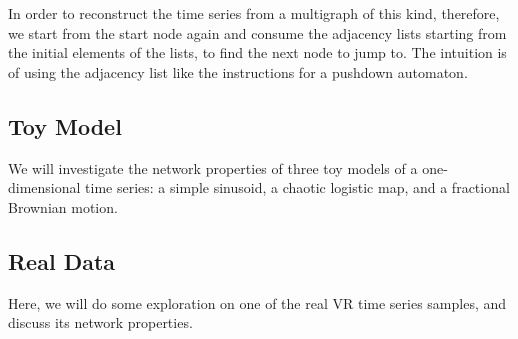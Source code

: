 \documentclass[12pt]{article}
\begin{document}
In order to reconstruct the time series from a multigraph of this kind, therefore, we start from the start node again and consume the adjacency lists starting from the initial elements of the lists, to find the next node to jump to. The intuition is of using the adjacency list like the instructions for a pushdown automaton\cite{pushdown}.


\subsection{Toy Model}

We will investigate the network properties of three toy models of a one-dimensional time series: a simple sinusoid, a chaotic logistic map, and a fractional Brownian motion.




\subsection{Real Data}

Here, we will do some exploration on one of the real VR time series samples, and discuss its network properties.


\end{document}

